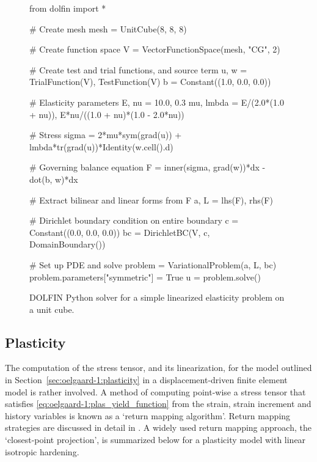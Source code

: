 \begin{figure}
\begin{python}
from dolfin import *

# Create mesh
mesh = UnitCube(8, 8, 8)

# Create function space
V = VectorFunctionSpace(mesh, "CG", 2)

# Create test and trial functions, and source term
u, w = TrialFunction(V), TestFunction(V)
b = Constant((1.0, 0.0, 0.0))

# Elasticity parameters
E, nu = 10.0, 0.3
mu, lmbda = E/(2.0*(1.0 + nu)), E*nu/((1.0 + nu)*(1.0 - 2.0*nu))

# Stress
sigma = 2*mu*sym(grad(u)) + lmbda*tr(grad(u))*Identity(w.cell().d)

# Governing balance equation
F = inner(sigma, grad(w))*dx - dot(b, w)*dx

# Extract bilinear and linear forms from F
a, L = lhs(F), rhs(F)

# Dirichlet boundary condition on entire boundary
c  = Constant((0.0, 0.0, 0.0))
bc = DirichletBC(V, c, DomainBoundary())

# Set up PDE and solve
problem = VariationalProblem(a, L, bc)
problem.parameters["symmetric"] = True
u = problem.solve()
\end{python}
\caption{DOLFIN Python solver for a simple linearized elasticity problem
on a unit cube.}
\label{fig:oelgaard-1:elas_code}
\end{figure}

\subsection{Plasticity}
\label{sec:oelgaard-1:examples_plasticity}

The computation of the stress tensor, and its linearization,
for the model outlined in Section~\ref{sec:oelgaard-1:plasticity}
in a displacement-driven finite element model is rather involved.
A method of computing point-wise a stress tensor that satisfies
\eqref{eq:oelgaard-1:plas_yield_function} from the strain, strain
increment and history variables is known as a `return mapping
algorithm'.  Return mapping strategies are discussed in detail in
\citet{SimoHughes1998}.  A widely used return mapping approach, the
`closest-point projection', is summarized below for a plasticity model
with linear isotropic hardening.

